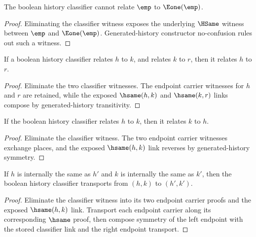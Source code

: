 \begin{theorem}
\label{thm:bool-history-classifier-constructor-separation}
The boolean history classifier cannot relate \(\emp\) to \(\Eone(\emp)\).
\end{theorem}
\begin{proof}
Eliminating the classifier witness exposes the underlying \(\HSame\) witness
between \(\emp\) and \(\Eone(\emp)\). Generated-history constructor
no-confusion rules out such a witness.
\end{proof}

\begin{theorem}
\label{thm:bool-history-classifier-transitivity}
If a boolean history classifier relates \(h\) to \(k\), and relates \(k\) to
\(r\), then it relates \(h\) to \(r\).
\end{theorem}
\begin{proof}
Eliminate the two classifier witnesses. The endpoint carrier witnesses for
\(h\) and \(r\) are retained, while the exposed \(\hsame(h,k)\) and
\(\hsame(k,r)\) links compose by generated-history transitivity.
\end{proof}

\begin{theorem}
\label{thm:bool-history-classifier-symmetry}
If the boolean history classifier relates \(h\) to \(k\), then it relates
\(k\) to \(h\).
\end{theorem}
\begin{proof}
Eliminate the classifier witness. The two endpoint carrier witnesses exchange
places, and the exposed \(\hsame(h,k)\) link reverses by generated-history
symmetry.
\end{proof}

\begin{theorem}
\label{thm:bool-history-classifier-hsame-transport}
If $h$ is internally the same as $h'$ and $k$ is internally the same as $k'$,
then the boolean history classifier transports from $(h,k)$ to $(h',k')$.
\end{theorem}
\begin{proof}
Eliminate the classifier witness into its two endpoint carrier proofs and the
exposed $\hsame(h,k)$ link. Transport each endpoint carrier along its
corresponding $\hsame$ proof, then compose symmetry of the left endpoint with
the stored classifier link and the right endpoint transport.
\end{proof}

